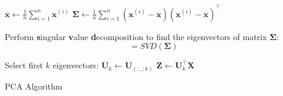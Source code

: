 \begin{algorithm}[H]
	\DontPrintSemicolon
	\footnotesize
	$\overline{\bm{x}}
		\longleftarrow \frac{1}{n} \sum_{i=1}^n \bm{x}^{(i)}$
		\;
	$\bm{\Sigma}
		\longleftarrow \frac{1}{n} \sum_{i = 1}^n (\bm{x}^{(i)} - \overline{\bm{x}}) (\bm{x}^{(i)}
			- \overline{\bm{x}})^{\intercal}$
			\;

	Perform \textbf{s}ingular \textbf{v}alue \textbf{d}ecomposition to find the eigenvectors of matrix $\bm{\Sigma}$:
	\begin{equation*}
		[\bm{U}, \bm{S}, \bm{V}] = SVD(\bm{\Sigma})
	\end{equation*}
	\vspace*{-6mm}

	Select first $k$ eigenvectors: $\bm{U}_k \longleftarrow \bm{U}_{(:,:k)}$
		\;
	$\bm{Z} \longleftarrow \bm{U}_k^{\intercal} \bm{X}$
	
	\caption{PCA Algorithm}
\end{algorithm}